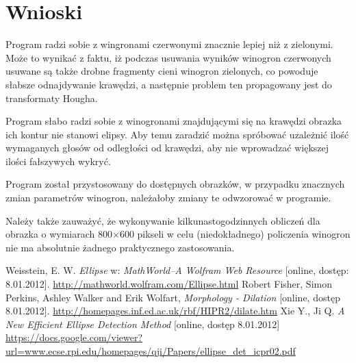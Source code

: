 \documentclass{classrep}
\begin{document}
\section{Wnioski}
Program radzi sobie z wingronami czerwonymi znacznie lepiej niż z zielonymi. Może to wynikać z faktu, iż podczas usuwania wyników winogron czerwonych usuwane są także drobne fragmenty cieni winogron zielonych, co powoduje słabsze odnajdywanie krawędzi, a następnie problem ten propagowany jest do transformaty Hougha.

Program słabo radzi sobie z winogronami znajdującymi się na krawędzi obrazka \ppauza ich kontur nie stanowi elipsy. Aby temu zaradzić można spróbować uzależnić ilość wymaganych głosów od odległości od krawędzi, aby nie wprowadzać większej ilości fałszywych wykryć.

Program został przystosowany do dostępnych obrazków, w przypadku znacznych zmian parametrów winogron, należałoby zmiany te odwzorować w programie.

Należy także zauważyć, że wykonywanie kilkunastogodzinnych obliczeń dla obrazka o wymiarach 800$\times$600 pikseli w celu (niedokładnego) policzenia winogron nie ma absolutnie żadnego praktycznego zastosowania.

\begin{thebibliography}{0}
   Weisstein, E. W. \textit{Ellipse} w: \textit{MathWorld--A Wolfram Web Resource} [online, dostęp: 8.01.2012]. \url{http://mathworld.wolfram.com/Ellipse.html}
   Robert Fisher, Simon Perkins, Ashley Walker and Erik Wolfart, \textit{Morphology - Dilation} [online, dostęp 8.01.2012]. \url{http://homepages.inf.ed.ac.uk/rbf/HIPR2/dilate.htm}
   Xie Y., Ji Q. \textit{A New Efficient Ellipse Detection Method} [online, dostęp 8.01.2012] \url{https://docs.google.com/viewer?url=www.ecse.rpi.edu/homepages/qji/Papers/ellipse_det_icpr02.pdf}
\end{thebibliography}
\end{document}
